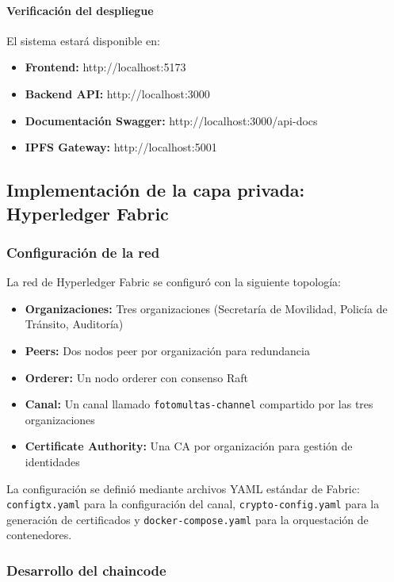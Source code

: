 \paragraph{Verificación del despliegue}
El sistema estará disponible en:
\begin{itemize}
    \item \textbf{Frontend:} http://localhost:5173
    \item \textbf{Backend API:} http://localhost:3000
    \item \textbf{Documentación Swagger:} http://localhost:3000/api-docs
    \item \textbf{IPFS Gateway:} http://localhost:5001
\end{itemize}

\subsection{Implementación de la capa privada: Hyperledger Fabric}

\subsubsection{Configuración de la red}

La red de Hyperledger Fabric se configuró con la siguiente topología:

\begin{itemize}
    \item \textbf{Organizaciones:} Tres organizaciones (Secretaría de Movilidad, Policía de Tránsito, Auditoría)
    \item \textbf{Peers:} Dos nodos peer por organización para redundancia
    \item \textbf{Orderer:} Un nodo orderer con consenso Raft
    \item \textbf{Canal:} Un canal llamado \texttt{fotomultas-channel} compartido por las tres organizaciones
    \item \textbf{Certificate Authority:} Una CA por organización para gestión de identidades
\end{itemize}

La configuración se definió mediante archivos YAML estándar de Fabric: \texttt{configtx.yaml} para la configuración del canal, \texttt{crypto-config.yaml} para la generación de certificados y \texttt{docker-compose.yaml} para la orquestación de contenedores.

\subsubsection{Desarrollo del chaincode}

